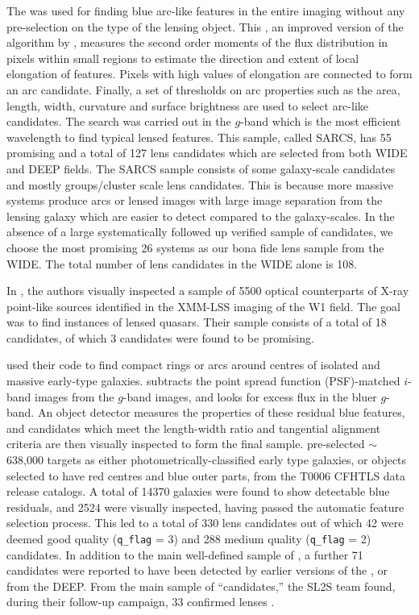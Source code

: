 \documentclass[useAMS,usenatbib,a4paper]{mn2e}
\begin{document}
The \af \citep{More2012} was used for finding blue arc-like features in
the entire \cfhtls imaging without any pre-selection on the type of the
lensing object. This \af, an improved version of the algorithm by
\citet{Alard2006}, measures the second order moments of the flux
distribution in pixels within small regions to estimate the direction
and extent of local elongation of features. Pixels with high values of
elongation are connected to form an arc candidate. Finally, a set of
thresholds on arc properties such as the area, length, width, curvature
and surface brightness are used to select arc-like candidates. The
search was carried out in the $g$-band which is the most efficient
wavelength to find typical lensed features.  This sample, called SARCS,
has 55 promising and a total of 127 lens candidates which are selected
from both \cfhtls WIDE and DEEP fields. The SARCS sample consists of
some galaxy-scale candidates and mostly groups/cluster scale lens
candidates. This is because more massive systems produce arcs or lensed
images with large image separation from the lensing galaxy which are
easier to detect compared to the galaxy-scales. In the absence of a
large systematically followed up verified sample of candidates, we
choose the most promising 26 systems as our bona fide lens sample from
the \cfhtls WIDE. The total number of lens candidates in the \cfhtls
WIDE alone is 108.

In \citet{Elyiv2013}, the authors visually inspected a sample of 5500 optical
counterparts of X-ray point-like sources identified in the XMM-LSS
imaging of the \cfhtls W1 field. The goal was to find instances
of lensed quasars. Their sample consists of a total of 18 candidates,
of which 3 candidates were found to be promising.

\citet{Gavazzi2014} used their \rf code to find compact rings or arcs
around centres of isolated and massive early-type galaxies. \rf
subtracts the point spread function (PSF)-matched $i$-band images from the $g$-band images, and
looks for excess flux in the bluer $g$-band. An object detector measures
the properties of these residual blue features, and candidates which
meet the length-width ratio and tangential alignment criteria are then
visually inspected to form the final sample. \citet{Gavazzi2014}
pre-selected $\sim$638,000 targets as either photometrically-classified
early type galaxies, or objects selected to have red centres and blue
outer parts, from the T0006 CFHTLS data release catalogs. A total of
14370 galaxies were found to show detectable blue residuals, and 2524
were visually inspected, having passed the automatic feature selection
process. This led to a total of 330 lens candidates out of which 42 were deemed
good quality (\texttt{q\_flag} = 3) and 288  medium quality
(\texttt{q\_flag} = 2) candidates. In addition to the main well-defined
sample of \citet{Gavazzi2014}, a further 71 candidates were reported to
have been detected by earlier versions of the \rf, or from the \cfhtls DEEP.
From the main sample of ``\rf candidates,'' the SL2S team found, during
their follow-up campaign, 33 confirmed lenses \citep{Sonnenfeld2013a,Sonnenfeld2013b}.
\end{document}
